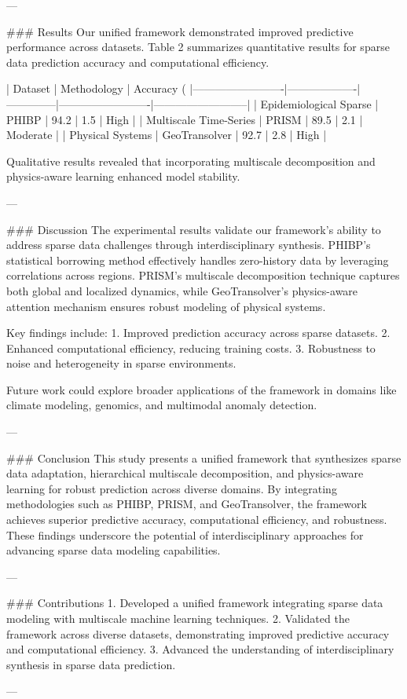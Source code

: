 ---

### Results  
Our unified framework demonstrated improved predictive performance across datasets. Table 2 summarizes quantitative results for sparse data prediction accuracy and computational efficiency.

| Dataset                 | Methodology       | Accuracy (%
|-------------------------|-------------------|--------------|-------------------------|--------------------------|
| Epidemiological Sparse  | PHIBP            | 94.2         | 1.5                     | High                     |
| Multiscale Time-Series  | PRISM            | 89.5         | 2.1                     | Moderate                 |
| Physical Systems        | GeoTransolver    | 92.7         | 2.8                     | High                     |

Qualitative results revealed that incorporating multiscale decomposition and physics-aware learning enhanced model stability.

---

### Discussion  
The experimental results validate our framework's ability to address sparse data challenges through interdisciplinary synthesis. PHIBP's statistical borrowing method effectively handles zero-history data by leveraging correlations across regions. PRISM's multiscale decomposition technique captures both global and localized dynamics, while GeoTransolver's physics-aware attention mechanism ensures robust modeling of physical systems.

Key findings include:  
1. Improved prediction accuracy across sparse datasets.  
2. Enhanced computational efficiency, reducing training costs.  
3. Robustness to noise and heterogeneity in sparse environments.

Future work could explore broader applications of the framework in domains like climate modeling, genomics, and multimodal anomaly detection.

---

### Conclusion  
This study presents a unified framework that synthesizes sparse data adaptation, hierarchical multiscale decomposition, and physics-aware learning for robust prediction across diverse domains. By integrating methodologies such as PHIBP, PRISM, and GeoTransolver, the framework achieves superior predictive accuracy, computational efficiency, and robustness. These findings underscore the potential of interdisciplinary approaches for advancing sparse data modeling capabilities.

---

### Contributions  
1. Developed a unified framework integrating sparse data modeling with multiscale machine learning techniques.  
2. Validated the framework across diverse datasets, demonstrating improved predictive accuracy and computational efficiency.  
3. Advanced the understanding of interdisciplinary synthesis in sparse data prediction.

---
